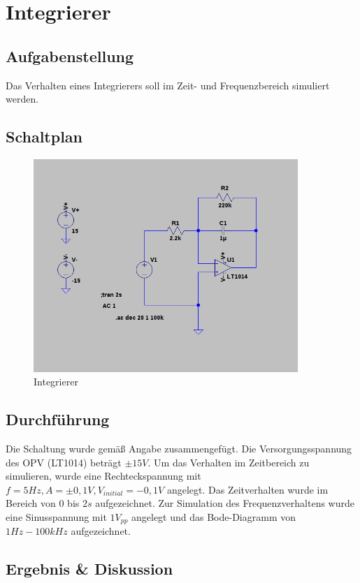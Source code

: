 \documentclass[12pt,a4paper,titlepage]{article}
\begin{document}
\section{Integrierer}

\subsection{Aufgabenstellung}
Das Verhalten eines Integrierers soll im Zeit- und Frequenzbereich simuliert werden.

\subsection{Schaltplan}
\begin{figure}[H]
  \centering
  \includegraphics[width=100mm]{integrierer_schaltung.png}
  \caption{Integrierer}
\end{figure}

\subsection{Durchf\"uhrung}
Die Schaltung wurde gem\"aß Angabe zusammengef\"ugt. Die Versorgungsspannung des OPV (LT1014) betr\"agt $\pm 15V$. Um das Verhalten im Zeitbereich zu simulieren, wurde eine Rechteckspannung mit $f=5Hz, A=\pm 0,1V, V_{initial}=-0,1V$ angelegt. Das Zeitverhalten wurde im Bereich von $0$ bis $2s$ aufgezeichnet. Zur Simulation des Frequenzverhaltens wurde eine Sinusspannung mit $1V_{pp}$ angelegt und das Bode-Diagramm von $1Hz-100kHz$ aufgezeichnet.

\subsection{Ergebnis \& Diskussion}
\end{document}

